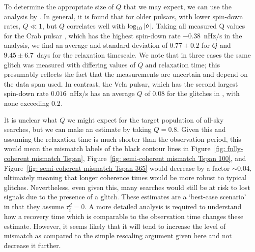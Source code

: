 \documentclass[../full_thesis/full_thesis.tex]{subfiles}
\begin{document}
To determine the appropriate size of $Q$ that we may expect, we can use the
analysis by \citet{Lyne2000}. In general, it is found that for older pulsars,
with lower spin-down rates, $Q\ll1$, but $Q$ correlates well with
$\log_{10}|\dot{\nu}|$. Taking all measured Q values for the Crab pulsar
\citep{Lyne2000, Wang2001, Wang2012}, which has the highest spin-down rate
$-0.38$~nHz/s in the analysis, we find an average and standard-deviation of
$0.77\pm0.2$ for $Q$ and $9.45\pm6.7$~days for the relaxation timescale. We
note that in three cases the same glitch was measured with differing values of
$Q$ and relaxation time; this presumably reflects the fact that the
measurements are uncertain and depend on the data span used. In contrast, the
Vela pulsar, which has the second largest spin-down rate $0.016$~nHz/s has an
average $Q$ of 0.08 for the glitches in \citet{Lyne2000}, with none exceeding
0.2.

It is unclear what $Q$ we might expect for the target population of all-sky
searches, but we can make an estimate by taking $Q=0.8$. Given this and
assuming the relaxation time is much shorter than the observation period, this
would mean the mismatch labels of the black contour lines in Figure~\ref{fig:
fully-coherent mismatch Tspan}, Figure~\ref{fig: semi-coherent mismatch Tspan 100},
and Figure~\ref{fig: semi-coherent mismatch Tspan 365} would decrease by a factor
$\sim0.04$, ultimately meaning that longer coherence times would be more robust
to typical glitches. Nevertheless, even given this, many searches would still
be at risk to lost signals due to the presence of a glitch. These estimates are
a `best-case scenario' in that they assume $\tau^d_i =0$. A more detailed
analysis is required to understand how a recovery time which is comparable to
the observation time changes these estimate. However, it seems likely that it
will tend to increase the level of mismatch as compared to
the simple rescaling argument given here and not decrease it further.
\end{document}
